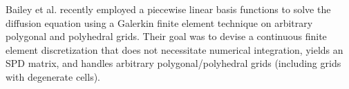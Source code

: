 \documentclass[preprint,10pt]{elsarticle}
\renewcommand{\(}{\left(}
\renewcommand{\)}{\right)}
\renewcommand{\[}{\left[}
\renewcommand{\]}{\right]}
\begin{document}
%
%
Bailey et al. \cite{BaileyAdams2008} recently employed a piecewise linear basis
functions to solve the diffusion equation using a Galerkin finite element technique on 
arbitrary polygonal and polyhedral grids. Their goal was to devise a continuous finite 
element discretization that does not necessitate numerical integration, yields an SPD matrix, 
and handles arbitrary polygonal/polyhedral grids (including grids with degenerate cells).
\end{document}
